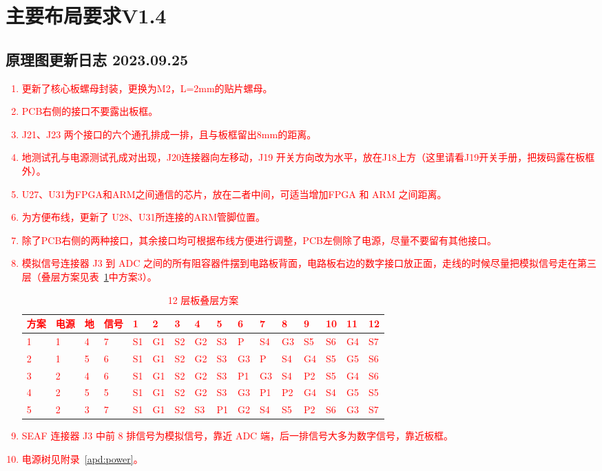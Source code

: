 
\chapter*{主要布局要求V1.4}
\section*{原理图更新日志 2023.09.25}
\textcolor{red}{
  \begin{enumerate}
    \item 更新了核心板螺母封装，更换为M2，L=2mm的贴片螺母。
    \item PCB右侧的接口不要露出板框。
    \item J21、J23 两个接口的六个通孔排成一排，且与板框留出8mm的距离。
    \item 地测试孔与电源测试孔成对出现，J20连接器向左移动，J19 开关方向改为水平，放在J18上方（这里请看J19开关手册，把拨码露在板框外）。
    \item U27、U31为FPGA和ARM之间通信的芯片，放在二者中间，可适当增加FPGA 和 ARM 之间距离。
    \item 为方便布线，更新了 U28、U31所连接的ARM管脚位置。
    \item 除了PCB右侧的两种接口，其余接口均可根据布线方便进行调整，PCB左侧除了电源，尽量不要留有其他接口。
    \item 模拟信号连接器 J3 到 ADC 之间的所有阻容器件摆到电路板背面，电路板右边的数字接口放正面，走线的时候尽量把模拟信号走在第三层（叠层方案见表~\ref{tab:12laminate}中方案3）。
    \begin{table}[ht]
      \caption{12 层板叠层方案}
      \label{tab:12laminate}
      \centering
      \begin{tabular}{p{1em}p{1em}p{1em}p{1em}p{1em}p{1em}p{1em}p{1em}p{1em}p{1em}p{1em}p{1em}p{1em}p{1em}p{1em}p{1em}}
        \toprule
        方案 & 电源 & 地 & 信号 & 1 & 2 & 3 & 4 & 5 & 6 & 7 & 8 & 9 & 10 & 11 &12\\
        \midrule
        1 & 1 & 4 & 7 & S1 & G1 & S2 & G2 & S3 & P & S4 & G3 & S5 & S6 & G4 & S7\\
        2 & 1 & 5 & 6 & S1 & G1 & S2 & G2 & S3 & G3 & P & S4 & G4 & S5 & G5 & S6\\
        3 & 2 & 4 & 6 & S1 & G1 & S2 & G2 & S3 & P1 & G3 & S4 & P2 & S5 & G4 & S6\\
        4 & 2 & 5 & 5 & S1 & G1 & S2 & G2 & S3 & G3 & P1 & P2 & G4 & S4 & G5 & S5\\
        5 & 2 & 3 & 7 & S1 & G1 & S2 & S3 & P1 & G2 & S4 & S5 & P2 & S6 & G3 & S7\\
        \bottomrule
      \end{tabular}
    \end{table}
    \item SEAF 连接器 J3 中前 8 排信号为模拟信号，靠近 ADC 端，后一排信号大多为数字信号，靠近板框。
    \item 电源树见附录~\ref{apd:power}。
  \end{enumerate}
}
